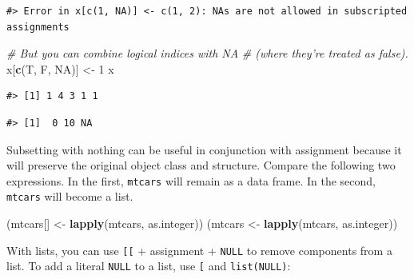 \documentclass[]{book}
\newenvironment{Shaded}{\begin{snugshade}}{\end{snugshade}}
\newcommand{\KeywordTok}[1]{\textcolor[rgb]{0.13,0.29,0.53}{\textbf{#1}}}
\newcommand{\DataTypeTok}[1]{\textcolor[rgb]{0.13,0.29,0.53}{#1}}
\newcommand{\DecValTok}[1]{\textcolor[rgb]{0.00,0.00,0.81}{#1}}
\newcommand{\StringTok}[1]{\textcolor[rgb]{0.31,0.60,0.02}{#1}}
\newcommand{\CommentTok}[1]{\textcolor[rgb]{0.56,0.35,0.01}{\textit{#1}}}
\newcommand{\OtherTok}[1]{\textcolor[rgb]{0.56,0.35,0.01}{#1}}
\newcommand{\OperatorTok}[1]{\textcolor[rgb]{0.81,0.36,0.00}{\textbf{#1}}}
\newcommand{\NormalTok}[1]{#1}
\theoremstyle{definition}
\theoremstyle{definition}
\theoremstyle{definition}
\theoremstyle{remark}
\begin{document}
\begin{verbatim}
#> Error in x[c(1, NA)] <- c(1, 2): NAs are not allowed in subscripted assignments
\end{verbatim}

\begin{Shaded}
\begin{Highlighting}[]
\CommentTok{# But you can combine logical indices with NA}
\CommentTok{# (where they're treated as false).}
\NormalTok{x[}\KeywordTok{c}\NormalTok{(T, F, }\OtherTok{NA}\NormalTok{)] <-}\StringTok{ }\DecValTok{1}
\NormalTok{x}
\end{Highlighting}
\end{Shaded}

\begin{verbatim}
#> [1] 1 4 3 1 1
\end{verbatim}

\begin{Shaded}
\end{Shaded}

\begin{verbatim}
#> [1]  0 10 NA
\end{verbatim}

Subsetting with nothing can be useful in conjunction with assignment
because it will preserve the original object class and structure.
Compare the following two expressions. In the first, \texttt{mtcars}
will remain as a data frame. In the second, \texttt{mtcars} will become
a list.

\begin{Shaded}
\begin{Highlighting}[]
\NormalTok{(mtcars[] <-}\StringTok{ }\KeywordTok{lapply}\NormalTok{(mtcars, as.integer))}
\NormalTok{(mtcars <-}\StringTok{ }\KeywordTok{lapply}\NormalTok{(mtcars, as.integer))}
\end{Highlighting}
\end{Shaded}

With lists, you can use \texttt{{[}{[}} + assignment + \texttt{NULL} to
remove components from a list. To add a literal \texttt{NULL} to a list,
use \texttt{{[}} and \texttt{list(NULL)}:
\end{document}
